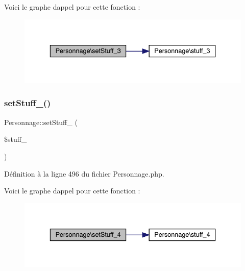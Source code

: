 Voici le graphe d\textquotesingle{}appel pour cette fonction \+:\nopagebreak
\begin{figure}[H]
\begin{center}
\leavevmode
\includegraphics[width=336pt]{class_personnage_a48859f66a778f1d3f594fb5b446895a3_cgraph}
\end{center}
\end{figure}
\mbox{\label{class_personnage_a0bad1f23e4eb487d76ba19f3e9d019ba}} 
\subsubsection{\texorpdfstring{set\+Stuff\+\_()}{setStuff\_4()}}
{\footnotesize\ttfamily Personnage\+::set\+Stuff\+\_ (\begin{DoxyParamCaption}\item[{}]{\$stuff\+\_ }\end{DoxyParamCaption})}



Définition à la ligne 496 du fichier Personnage.\+php.

Voici le graphe d\textquotesingle{}appel pour cette fonction \+:\nopagebreak
\begin{figure}[H]
\begin{center}
\leavevmode
\includegraphics[width=336pt]{class_personnage_a0bad1f23e4eb487d76ba19f3e9d019ba_cgraph}
\end{center}
\end{figure}
\mbox{\label{class_personnage_aaa13eb033ef4a4e116dc223942cc8e37}} 
